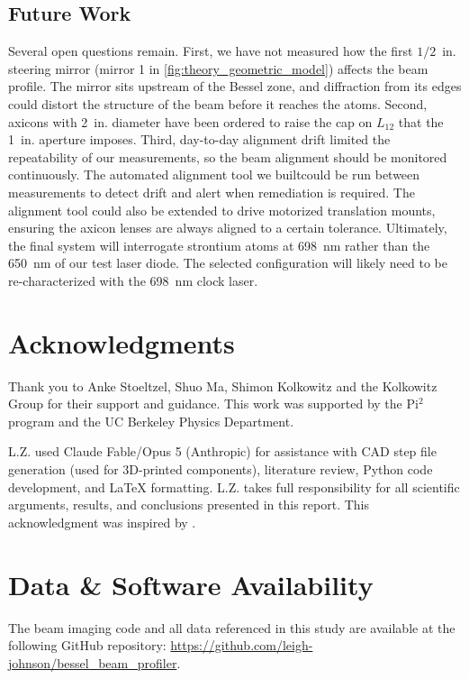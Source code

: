 \documentclass[
  aps,
  twocolumn,
  reprint,              %
  superscriptaddress,
  amsmath,
  amssymb,
  floatfix,
  longbibliography,      %
  nofootinbib %
]{revtex4-2}
\begin{document}
\subsection{Future Work}\label{sec:future_work}
Several open questions remain. First, we have not measured how the first $1/2$~in. steering mirror (mirror 1 in \autoref{fig:theory_geometric_model}) affects the beam profile. The mirror sits upstream of the Bessel zone, and diffraction from its edges could distort the structure of the beam before it reaches the atoms. Second, axicons with 2~in. diameter have been ordered to raise the cap on $L_{12}$ that the 1~in. aperture imposes. Third, day-to-day alignment drift limited the repeatability of our measurements, so the beam alignment should be monitored continuously. The automated alignment tool we built\footnotemark[3] could be run between measurements to detect drift and alert when remediation is required. The alignment tool could also be extended to drive motorized translation mounts, ensuring the axicon lenses are always aligned to a certain tolerance. Ultimately, the final system will interrogate strontium atoms at \SI{698}{\nano\meter} rather than the \SI{650}{\nano\meter} of our test laser diode. The selected configuration will likely need to be re-characterized with the \SI{698}{\nano\meter} clock laser.

\newpage
{}
\section*{Acknowledgments}
Thank you to Anke Stoeltzel, Shuo Ma, Shimon Kolkowitz and the Kolkowitz Group for their support and guidance. This work was supported by the Pi$^2$ program and the UC Berkeley Physics Department.

L.Z. used Claude Fable/Opus 5 (Anthropic) for assistance with CAD step file generation (used for 3D-printed components), literature review, Python code development, and LaTeX formatting. L.Z. takes full responsibility for all scientific arguments, results, and conclusions presented in this report. This acknowledgment was inspired by \citet{ceriottiEditorialPublishingPhysical2026}.

\section*{Data \& Software Availability}
The beam imaging code and all data referenced in this study are available at the following GitHub repository: \url{https://github.com/leigh-johnson/bessel_beam_profiler}.
\end{document}

